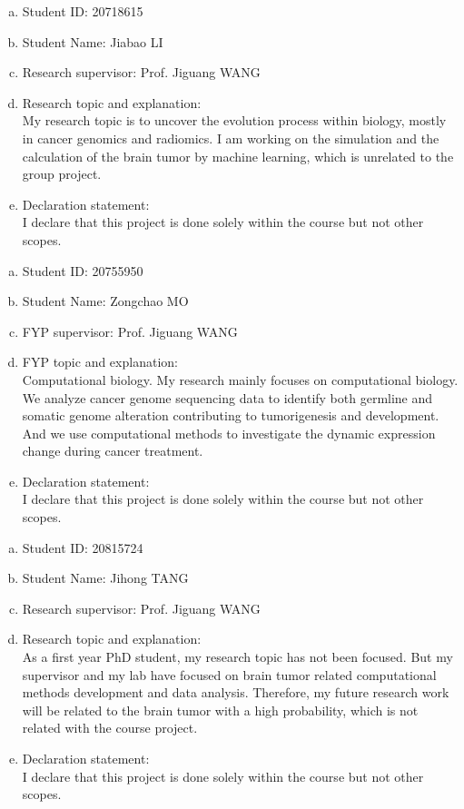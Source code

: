 \documentclass[11pt]{article}
\begin{document}
\begin{member}
	\begin{enumerate}[(a)]
		\item Student ID: 20718615
		\item Student Name: Jiabao LI
		\item Research supervisor: Prof. Jiguang WANG
		\item Research topic and explanation: \\
		My research topic is to uncover the evolution process within biology, mostly in cancer genomics and radiomics. I am working on the simulation and the calculation of the brain tumor by machine learning, which is unrelated to the group project.
		\item Declaration statement: \\
		I declare that this project is done solely within the course but not other scopes.
	\end{enumerate}
\end{member}

\begin{member}
	\begin{enumerate}[(a)]
		\item Student ID: 20755950
		\item Student Name: Zongchao MO
		\item FYP supervisor: Prof. Jiguang WANG
		\item FYP topic and explanation: \\
		Computational biology. My research mainly focuses on computational biology. We analyze cancer genome sequencing data to identify both germline and somatic genome alteration contributing to tumorigenesis and development. And we use computational methods to investigate the dynamic expression change during cancer treatment.
		\item Declaration statement: \\
		I declare that this project is done solely within the course but not other scopes.
	\end{enumerate}
\end{member}

\begin{member}
	\begin{enumerate}[(a)]
		\item Student ID: 20815724
		\item Student Name: Jihong TANG
		\item Research supervisor: Prof. Jiguang WANG
		\item Research topic and explanation: \\
		As a first year PhD student, my research topic has not been focused. But my supervisor and my lab have focused on brain tumor related computational  methods development and data analysis. Therefore, my future research work will be related to the brain tumor with a high probability, which is not related with the course project.
		\item Declaration statement: \\
		I declare that this project is done solely within the course but not other scopes.
	\end{enumerate}
\end{member}
\end{document}
